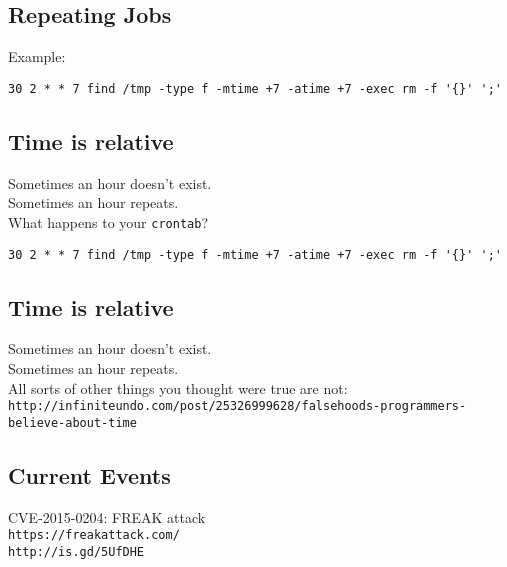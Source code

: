 \documentclass[xga]{xdvislides}
\begin{document}
\subsection{Repeating Jobs}
Example: \\
\vspace{.5in}

\begin{verbatim}
30 2 * * 7 find /tmp -type f -mtime +7 -atime +7 -exec rm -f '{}' ';'
\end{verbatim}

\subsection{Time is relative}
Sometimes an hour doesn't exist. \\

\vspace{.5in}
Sometimes an hour repeats. \\

\vspace{.5in}
What happens to your \verb+crontab+?
\begin{verbatim}
30 2 * * 7 find /tmp -type f -mtime +7 -atime +7 -exec rm -f '{}' ';'
\end{verbatim}

\subsection{Time is relative}
Sometimes an hour doesn't exist. \\

\vspace{.5in}
Sometimes an hour repeats. \\

\vspace{.5in}
All sorts of other things you thought were true are not: \\
\verb+http://infiniteundo.com/post/25326999628/falsehoods-programmers-believe-about-time+

\subsection{Current Events}
CVE-2015-0204: FREAK attack \\

\verb+https://freakattack.com/+ \\

\verb+http://is.gd/5UfDHE+ \\
\end{document}
